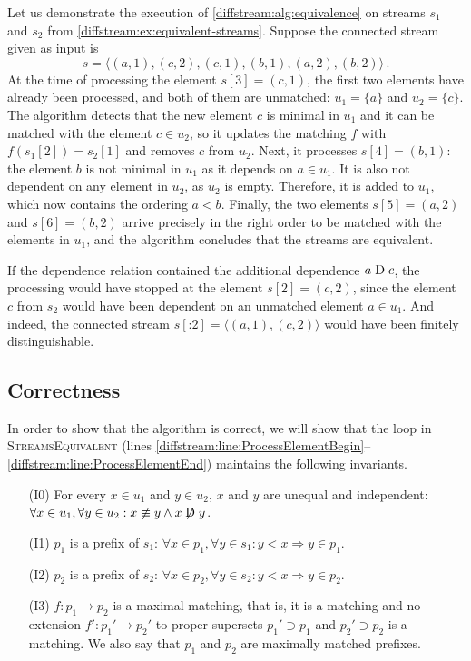 \begin{example}
    Let us demonstrate the execution of \cref{diffstream:alg:equivalence} on streams $s_1$ and $s_2$ from
    \cref{diffstream:ex:equivalent-streams}. Suppose the connected stream given as input
    is
    \[s=\langle (a, 1), (c, 2), (c, 1), (b, 1), (a, 2), (b, 2)\rangle \, .\]
    At the time of processing
    the element $s[3]=(c,1)$, the first two elements have already been processed, and both of them are
    unmatched: $u_1=\{a\}$ and $u_2=\{c\}$. The algorithm detects that the new element $c$ is minimal in
    $u_1$ and it can be matched with the element $c\in u_2$, so it updates the matching $f$ with
    $f(s_1[2])=s_2[1]$ and removes $c$ from $u_2$. Next, it processes $s[4]=(b,1)$: the element $b$
    is not minimal in $u_1$ as it depends on $a\in u_1$. It is also not dependent on any element in $u_2$,
    as $u_2$ is empty. Therefore, it is added to $u_1$, which now contains the ordering $a<b$. Finally,
    the two elements $s[5]=(a,2)$ and $s[6]=(b,2)$ arrive precisely in the right order to be matched with
    the elements in $u_1$, and the algorithm concludes that the streams are equivalent.

    If the dependence relation contained the additional dependence $a\mathrel{\mathrm{D}} c$, the processing would have
    stopped at the element $s[2]=(c,2)$, since the element $c$ from $s_2$ would have been dependent on an
    unmatched element $a\in u_1$. And indeed, the connected stream $s[\mathbin{:} 2]= \langle (a, 1), (c, 2)\rangle$
    would have been finitely distinguishable.
\end{example}

\subsection{Correctness}
\label{diffstream:sec:correctness}

In order to show that the algorithm is correct, we will show that
the loop in \textsc{StreamsEquivalent} (lines \ref{diffstream:line:ProcessElementBegin}--\ref{diffstream:line:ProcessElementEnd}) maintains the following invariants.
\begin{enumerate}
  \item[(I0)] For every $x\in u_1$ and $y\in u_2$, $x$ and $y$
    are unequal and independent:
    $\forall x\in u_1, \forall y\in u_2 : x\not\equiv y \land
    x\not\mathrel{\mathrm{D}} y$.
  \item[(I1)] $p_1$ is a prefix of $s_1$:
    $\forall x\in p_1, \forall y\in s_1 : y < x \Rightarrow y \in p_1$.
  \item[(I2)] $p_2$ is a prefix of $s_2$:
    $\forall x\in p_2, \forall y\in s_2 : y < x \Rightarrow y \in p_2$.
  \item[(I3)] $f\colon p_1\to p_2$ is a maximal matching, that is, it is a matching
    and no extension $f'\colon p_1'\to p_2'$ to proper supersets
    $p_1'\supset p_1$ and $p_2'\supset p_2$ is
    a matching. We also say that $p_1$ and $p_2$ are maximally matched
    prefixes.
\end{enumerate}

